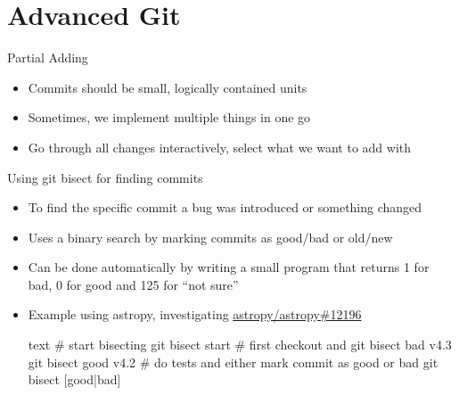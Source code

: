 \section{Advanced Git}

\begin{frame}[c, fragile]{Partial Adding}
  \begin{itemize}
    \item Commits should be small, logically contained units
    \item Sometimes, we implement multiple things in one go
    \item Go through all changes interactively, select what we want to add with
  \end{itemize}
\end{frame}


\begin{frame}[c, fragile]{Using git bisect for finding commits}
  \begin{itemize}
    \item To find the specific commit a bug was introduced or something changed
    \item Uses a binary search by marking commits as good/bad or old/new
    \item Can be done automatically by writing a small program that returns 1 for bad, 0 for good and 125 for \enquote{not sure}
    \item Example using astropy, investigating \href{https://github.com/astropy/astropy/issues/12196}{astropy/astropy\#12196}
    \begin{code}{text}
      # start bisecting
      git bisect start
      # first checkout and
      git bisect bad v4.3
      git bisect good v4.2
      # do tests and either mark commit as good or bad
      git bisect [good|bad]
    \end{code}
  \end{itemize}
\end{frame}

%


